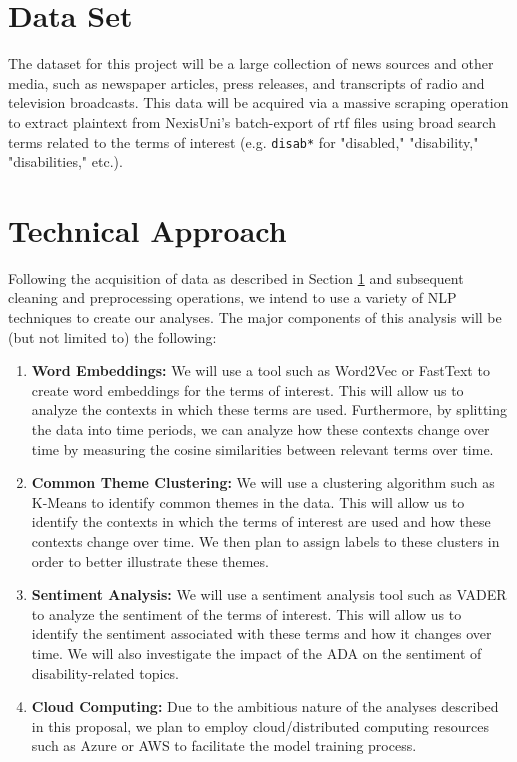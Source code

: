 \documentclass[letterpaper, twoside]{article}
\begin{document}
\section{Data Set} \label{sec:data}
The dataset for this project will be a large collection of news sources and other media, such as newspaper articles, press releases, and transcripts of radio and television broadcasts. This data will be acquired via a massive scraping operation to extract plaintext from NexisUni's batch-export of rtf files using broad search terms related to the terms of interest (e.g. \texttt{disab*} for "disabled," "disability," "disabilities," etc.).
\section{Technical Approach} \label{sec:tech}
Following the acquisition of data as described in Section \ref{sec:data} and subsequent cleaning and preprocessing operations, we intend to use a variety of NLP techniques to create our analyses. The major components of this analysis will be (but not limited to) the following:

\begin{enumerate}
    \item \textbf{Word Embeddings: }We will use a tool such as Word2Vec or FastText to create word embeddings for the terms of interest. This will allow us to analyze the contexts in which these terms are used. Furthermore, by splitting the data into time periods, we can analyze how these contexts change over time by measuring the cosine similarities between relevant terms over time.
    \item \textbf{Common Theme Clustering: }We will use a clustering algorithm such as K-Means to identify common themes in the data. This will allow us to identify the contexts in which the terms of interest are used and how these contexts change over time. We then plan to assign labels to these clusters in order to better illustrate these themes.
    \item \textbf{Sentiment Analysis: }We will use a sentiment analysis tool such as VADER to analyze the sentiment of the terms of interest. This will allow us to identify the sentiment associated with these terms and how it changes over time. We will also investigate the impact of the ADA on the sentiment of disability-related topics.
    \item \textbf{Cloud Computing: }Due to the ambitious nature of the analyses described in this proposal, we plan to employ cloud/distributed computing resources such as Azure or AWS to facilitate the model training process. 
\end{enumerate}
\end{document}

